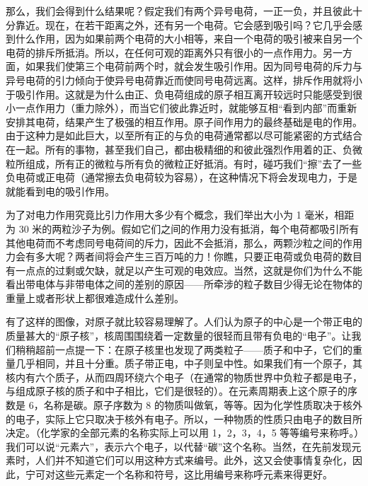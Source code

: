 \documentclass[12pt,oneside]{book}
\begin{document}
那么，我们会得到什么结果呢？假定我们有两个异号电荷，一正一负，并且彼此十分靠近。现在，在若干距离之外，还有另一个电荷。它会感到吸引吗？它几乎会感到什么作用，因为如果前两个电荷的大小相等，来自一个电荷的吸引被来自另一个电荷的排斥所抵消。所以，在任何可观的距离外只有很小的一点作用力。另一方面，如果我们使第三个电荷前两个时，就会发生吸引作用。因为同号电荷的斥力与异号电荷的引力倾向于使异号电荷靠近而使同号电荷远离。这样，排斥作用就将小于吸引作用。这就是为什么由正、负电荷组成的原子相互离开较远时只能感受到很小一点作用力（重力除外），而当它们彼此靠近时，就能够互相“看到内部”而重新安排其电荷，结果产生了极强的相互作用。原子间作用力的最终基础是电的作用。由于这种力是如此巨大，以至所有正的与负的电荷通常都以尽可能紧密的方式结合在一起。所有的事物，甚至我们自己，都由极精细的和彼此强烈作用着的正、负微粒所组成，所有正的微粒与所有负的微粒正好抵消。有时，碰巧我们“擦”去了一些负电荷或正电荷（通常擦去负电荷较为容易），在这种情况下将会发现电力，于是就能看到电的吸引作用。

为了对电力作用究竟比引力作用大多少有个概念，我们举出大小为 1 毫米，相距为 30 米的两粒沙子为例。假如它们之间的作用力没有抵消，每个电荷都吸引所有其他电荷而不考虑同号电荷间的斥力，因此不会抵消，那么，两颗沙粒之间的作用力会有多大呢？两者间将会产生三百万吨的力！你瞧，只要正电荷或负电荷的数目有一点点的过剩或欠缺，就足以产生可观的电效应。当然，这就是你们为什么不能看出带电体与非带电体之间的差别的原因——所牵涉的粒子数目少得无论在物体的重量上或者形状上都很难造成什么差别。

有了这样的图像，对原子就比较容易理解了。人们认为原子的中心是一个带正电的质量甚大的“原子核”，核周围围绕着一定数量的很轻而且带有负电的“电子”。让我们稍稍超前一点提一下：在原子核里也发现了两类粒子——质子和中子，它们的重量几乎相同，并且十分重。质子带正电，中子则呈中性。如果我们有一个原子，其核内有六个质子，从而四周环绕六个电子（在通常的物质世界中负粒子都是电子，与组成原子核的质子和中子相比，它们是很轻的）。在元素周期表上这个原子的序数是 6，名称是碳。原子序数为 8 的物质叫做氧，等等。因为化学性质取决于核外的电子，实际上它只取决于核外有电子。所以，一种物质的性质只由电子的数目所决定。（化学家的全部元素的名称实际上可以用 1，2，3，4，5 等等编号来称呼。）我们可以说“元素六”，表示六个电子，以代替“碳”这个名称。当然，在先前发现元素时，人们并不知道它们可以用这种方式来编号。此外，这又会使事情复杂化，因此，宁可对这些元素定一个名称和符号，这比用编号来称呼元素来得更好。
\end{document}
